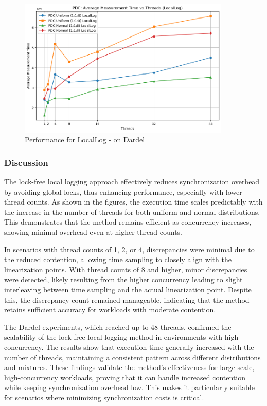 \documentclass{article}
\begin{document}
\begin{figure}[H]
    \centering
    \includegraphics[width=0.9\textwidth]{LaTex/images/Lab 3 2.4.2.3.png}
    \caption{Performance for LocalLog - on Dardel}
    \label{fig:performance_dardel_1}
\end{figure}


\subsubsection{Discussion}
The lock-free local logging approach effectively reduces synchronization overhead by avoiding global locks, thus enhancing performance, especially with lower thread counts. As shown in the figures, the execution time scales predictably with the increase in the number of threads for both uniform and normal distributions. This demonstrates that the method remains efficient as concurrency increases, showing minimal overhead even at higher thread counts.

In scenarios with thread counts of 1, 2, or 4, discrepancies were minimal due to the reduced contention, allowing time sampling to closely align with the linearization points. With thread counts of 8 and higher, minor discrepancies were detected, likely resulting from the higher concurrency leading to slight interleaving between time sampling and the actual linearization point. Despite this, the discrepancy count remained manageable, indicating that the method retains sufficient accuracy for workloads with moderate contention.

The Dardel experiments, which reached up to 48 threads, confirmed the scalability of the lock-free local logging method in environments with high concurrency. The results show that execution time generally increased with the number of threads, maintaining a consistent pattern across different distributions and mixtures. These findings validate the method’s effectiveness for large-scale, high-concurrency workloads, proving that it can handle increased contention while keeping synchronization overhead low. This makes it particularly suitable for scenarios where minimizing synchronization costs is critical.
\end{document}
